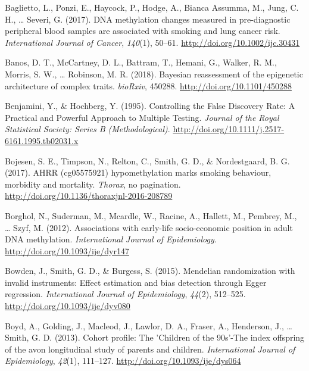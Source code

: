 \documentclass[11pt,twoside]{bristolthesis}
\newlength{\cslhangindent}
\newenvironment{cslreferences}%
  {\setlength{\parindent}{0pt}%
  \everypar{\setlength{\hangindent}{\cslhangindent}}\ignorespaces}%
  {\par}
\begin{document}
\hypertarget{refs}{}
\begin{cslreferences}
\leavevmode\hypertarget{ref-Baglietto2017}{}%
Baglietto, L., Ponzi, E., Haycock, P., Hodge, A., Bianca Assumma, M., Jung, C. H., \ldots{} Severi, G. (2017). DNA methylation changes measured in pre-diagnostic peripheral blood samples are associated with smoking and lung cancer risk. \emph{International Journal of Cancer}, \emph{140}(1), 50--61. \url{http://doi.org/10.1002/ijc.30431}

\leavevmode\hypertarget{ref-Banos2018}{}%
Banos, D. T., McCartney, D. L., Battram, T., Hemani, G., Walker, R. M., Morris, S. W., \ldots{} Robinson, M. R. (2018). Bayesian reassessment of the epigenetic architecture of complex traits. \emph{bioRxiv}, 450288. \url{http://doi.org/10.1101/450288}

\leavevmode\hypertarget{ref-Benjamini1995}{}%
Benjamini, Y., \& Hochberg, Y. (1995). Controlling the False Discovery Rate: A Practical and Powerful Approach to Multiple Testing. \emph{Journal of the Royal Statistical Society: Series B (Methodological)}. \url{http://doi.org/10.1111/j.2517-6161.1995.tb02031.x}

\leavevmode\hypertarget{ref-Bojesen2017}{}%
Bojesen, S. E., Timpson, N., Relton, C., Smith, G. D., \& Nordestgaard, B. G. (2017). AHRR (cg05575921) hypomethylation marks smoking behaviour, morbidity and mortality. \emph{Thorax}, no pagination. \url{http://doi.org/10.1136/thoraxjnl-2016-208789}

\leavevmode\hypertarget{ref-Borghol2012}{}%
Borghol, N., Suderman, M., Mcardle, W., Racine, A., Hallett, M., Pembrey, M., \ldots{} Szyf, M. (2012). Associations with early-life socio-economic position in adult DNA methylation. \emph{International Journal of Epidemiology}. \url{http://doi.org/10.1093/ije/dyr147}

\leavevmode\hypertarget{ref-Bowden2015}{}%
Bowden, J., Smith, G. D., \& Burgess, S. (2015). Mendelian randomization with invalid instruments: Effect estimation and bias detection through Egger regression. \emph{International Journal of Epidemiology}, \emph{44}(2), 512--525. \url{http://doi.org/10.1093/ije/dyv080}

\leavevmode\hypertarget{ref-Boyd2013}{}%
Boyd, A., Golding, J., Macleod, J., Lawlor, D. A., Fraser, A., Henderson, J., \ldots{} Smith, G. D. (2013). Cohort profile: The 'Children of the 90s'-The index offspring of the avon longitudinal study of parents and children. \emph{International Journal of Epidemiology}, \emph{42}(1), 111--127. \url{http://doi.org/10.1093/ije/dys064}


\end{cslreferences}
\end{document}
